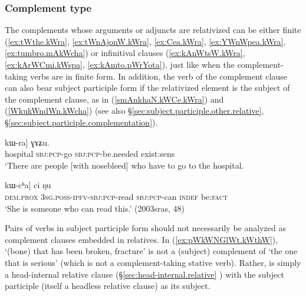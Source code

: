  
\subsubsection{Complement type} \label{sec:relativization.complement.type}
The complements whose arguments or adjuncts are relativized can be either finite (\ref{ex:tWthe.kWra}, \ref{ex:tWnAjonW.kWra}, \ref{ex:Cea.kWra}, \ref{ex:YWnWpea.kWra}, \ref{ex:tumbro.mAkWcha}) or infinitival clauses (\ref{ex:kAnWtsW.kWra}, \ref{ex:kArWCmi.kWspa}, \ref{ex:kAmto.pWrYota}), just like when the complement-taking verbs are in finite form. In addition, the verb of the complement clause can also bear subject participle form if the relativized element is the subject of the complement clause, as in (\ref{smAnkhaN.kWCe.kWra}) and (\ref{WkukWndWn.kWcha}) (see also §\ref{sec:subject.participle.other.relative}, §\ref{sec:subject.participle.complementation}).

\begin{exe}
\ex \label{smAnkhaN.kWCe.kWra}
\gll  [[smɤnkʰaŋ kɯ-ɕe] kɯ-ra] ɣɤʑu. \\
hospital \textsc{sbj}:\textsc{pcp}-go \textsc{sbj}:\textsc{pcp}-be.needed exist:sens \\
\glt `There are people [with nosebleed] who have to go to the hospital. \\
\end{exe}
 
\begin{exe}
\ex \label{WkukWndWn.kWcha}
\gll  [[kɯki ɯ-ku-kɯ-ndɯn] kɯ-cʰa] ci ŋu \\
\textsc{dem}.\textsc{prox} \textsc{3sg}.\textsc{poss}-\textsc{ipfv}-\textsc{sbj}:\textsc{pcp}-read \textsc{sbj}:\textsc{pcp}-can \textsc{indef} be:\textsc{fact} \\
\glt `She is someone who can read this.' (2003sras, 48)
\end{exe}

Pairs of verbs in subject participle form should not necessarily be analyzed as complement clauses embedded in relatives. In (\ref{ex:pWkWNGlWt.kWthW}),  `(bone) that has been broken, fracture' is not a (subject) complement of   `the one that is serious' (which is not a complement-taking stative verb). Rather,  is simply a head-internal relative clause (§\ref{sec:head-internal.relative} ) with the subject participle (itself a headless relative clause)  as its subject. 


